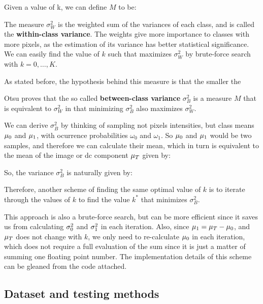 
Given a value of k, we can define $M$ to be:


The measure $\sigma_W^2$ is the weighted sum of the variances of each class, and is called the \textbf{within-class variance}. The weights give more importance to classes with more pixels, as the estimation of its variance has better statistical significance. We can easily find the value of $k$ such that maximizes $\sigma_W^2$ by brute-force search with $k=0,\dots,K$. 

As stated before, the hypothesis behind this measure is that the smaller the 

Otsu proves that the so called \textbf{between-class variance} $\sigma_B^2$ is a measure $M$ that is equivalent to $\sigma_W^2$ in that minimizing $\sigma_B^2$ also maximizes $\sigma_W^2$.  

We can derive $\sigma_B^2$ by thinking of sampling not pixels intensities, but class means $\mu_0$ and $\mu_1$, with ocurrence probabilities $\omega_0$ and $\omega_1$. So $\mu_0$ and $\mu_1$ would be two samples, and therefore we can calculate their mean, which in turn is equivalent to the mean of the image or dc component $\mu_T$ given by:


So, the variance $\sigma_B^2$ is naturally given by:


Therefore, another scheme of finding the same optimal value of $k$ is to iterate through the values of $k$ to find the value $k^*$ that minimizes $\sigma_B^2$. 

This approach is also a brute-force search, but can be more efficient since it saves us from calculating $\sigma_0^2$ and $\sigma_1^2$ in each iteration. Also, since $\mu_1=\mu_T-\mu_0$, and $\mu_T$ does not change with $k$, we only need to re-calculate $\mu_0$ in each iteration, which does not require a full evaluation of the sum since it is just a matter of summing one floating point number. The implementation details of this scheme can be gleaned from the code attached.

\subsection{Dataset and testing methods}

